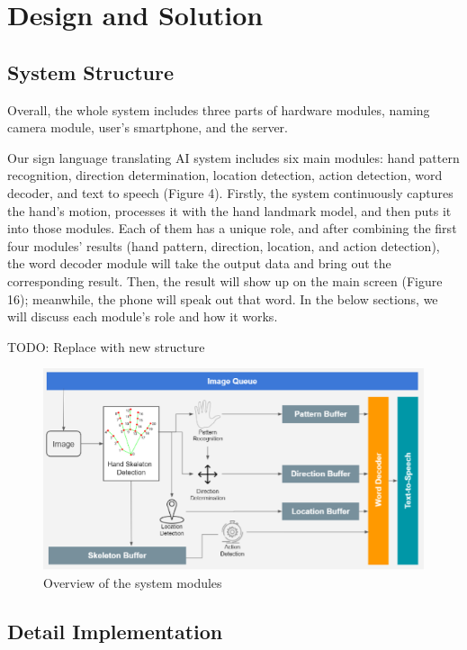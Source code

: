 \chapter{Design and Solution}

\section{System Structure}

Overall, the whole system includes three parts of hardware modules, naming camera module, user's smartphone, and the server.

Our sign language translating AI system includes six main modules: hand pattern recognition, direction determination, location detection, action detection, word decoder, and text to speech (Figure 4). Firstly, the system continuously captures the hand’s motion, processes it with the hand landmark model, and then puts it into those modules. Each of them has a unique role, and after combining the first four modules’ results (hand pattern, direction, location, and action detection), the word decoder module will take the output data and bring out the corresponding result. Then, the result will show up on the main screen (Figure 16); meanwhile, the phone will speak out that word. In the below sections, we will discuss each module’s role and how it works.

TODO: Replace with new structure

\begin{figure}[H]
  \centering
  \includegraphics[width=\textwidth]{img/Chap3/OverviewOfTheSystemModules.png}
  \caption{Overview of the system modules}
  \label{fig:Chap3-OverviewOfTheSystemModules}
\end{figure}

\section{Detail Implementation}


